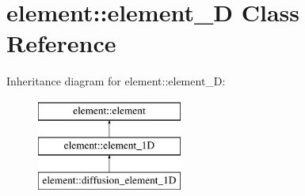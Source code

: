 \hypertarget{classelement_1_1element__1_d}{\section{element\-:\-:element\-\_\-D Class Reference}
\label{classelement_1_1element__1_d}
}
Inheritance diagram for element\-:\-:element\-\_\-D\-:\begin{figure}[H]
\begin{center}
\leavevmode
\includegraphics[height=3.000000cm]{classelement_1_1element__1_d}
\end{center}
\end{figure}
